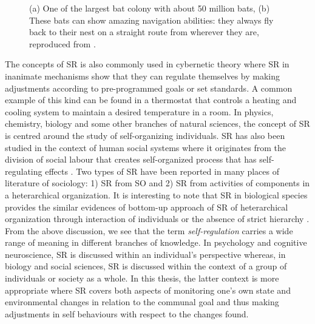 \begin{figure}[htp]
\centering
{} 
\hspace{0.25cm}
\caption{(a) One of the largest bat colony with about 50 million bats, (b) These bats can show amazing navigation abilities: they always fly back to their nest on a straight route from wherever they are, reproduced from \protect{}.}
\label{fig:bats-colony}
\end{figure}
The concepts of SR is also commonly used in cybernetic theory where SR in inanimate mechanisms show that they can regulate themselves by making adjustments according to pre-programmed goals or set standards. A common example of this kind can be found in a thermostat that controls a heating and cooling system to maintain a desired temperature in a room. In physics, chemistry, biology and some other branches of natural sciences, the concept of SR is centred around the study of self-organizing individuals. SR has also been studied in the context of human social systems where it originates from the division of social labour that creates self-organized process that has self-regulating effects \cite{Kppers+1990}. Two types of SR have been reported in many places of literature of sociology: 1) SR from SO and 2) SR from activities of components in a heterarchical organization. It is interesting to note that SR in biological species provides the similar evidences of bottom-up approach of SR of heterarchical organization through interaction of individuals or the absence of strict hierarchy \cite{Beer1981}.\\
From the above discussion, we see that the term {\em self-regulation} carries a wide range of meaning in different branches of knowledge. In psychology and cognitive neuroscience, SR is discussed within an individual's perspective whereas, in biology and social sciences, SR is discussed within the context of a group of individuals or society as a whole. In  this thesis, the latter context is more appropriate where  SR covers both aspects of monitoring one's own state and environmental changes in relation to the communal goal and thus making adjustments in self behaviours with respect to the changes found.
